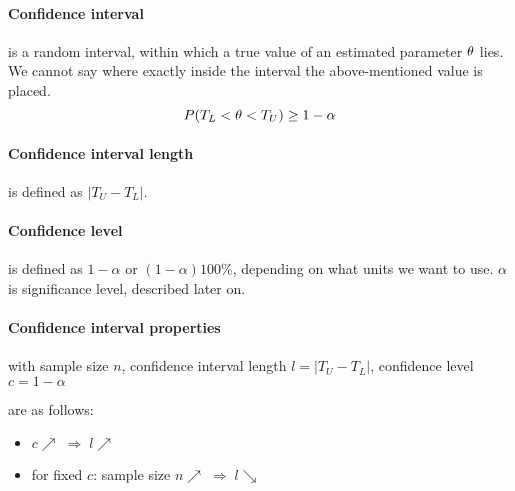 \paragraph{Confidence interval}
is a random interval, within which a true value of an estimated parameter $\theta$ lies. We cannot say
where exactly inside the interval the above-mentioned value is placed.
\[ P(T_L < \theta < T_U) \geq 1 - \alpha \]

\paragraph{Confidence interval length}
is defined as $|T_U - T_L|$.

\vfill

\paragraph{Confidence level}
is defined as $ 1 - \alpha $ or $ (1 - \alpha)100\% $, depending on what units we want to use.
$\alpha$ is significance level, described later on.

\paragraph{Confidence interval properties}
with sample size $n$, confidence interval length $l = |T_U - T_L|$, confidence level $c = 1 - \alpha$

\vspace{10pt} \noindent are as follows:
\begin{itemize}[noitemsep,nolistsep]
  \item $c \nearrow \; \Rightarrow \; l \nearrow$
  
  \item for fixed $c$: sample size $n \nearrow \; \Rightarrow \; l \searrow$
  
  
\end{itemize}
